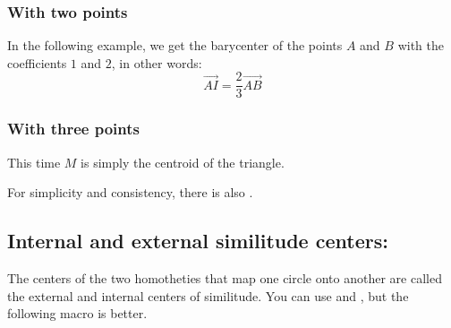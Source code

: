 \subsubsection{With two points}
In the following example, we get the barycenter of the points $A$ and $B$ with the coefficients $1$ and $2$, in other words:
\[
  \overrightarrow{AI}= \frac{2}{3}\overrightarrow{AB}
\]

\begin{tkzexample}[latex=7cm,small]
\end{tkzexample}

\subsubsection{With three points}
This time $M$ is simply the centroid of the triangle.

 For simplicity and consistency, there is also .
\begin{tkzexample}[latex=7cm,small]
\end{tkzexample}


\subsection{Internal and external similitude centers: }
The centers of the two homotheties that map one circle onto another are called the external and internal centers of similitude. You can use  and , but the following macro is better.


